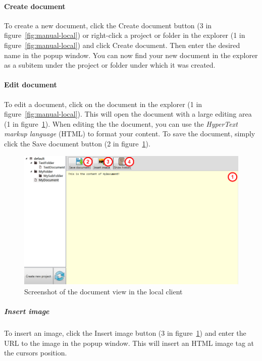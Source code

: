 	\paragraph{Create document}
	To create a new document, click the Create document button (3 in figure~\ref{fig:manual-local}) or right-click a project or folder in the explorer (1 in figure~\ref{fig:manual-local}) and click Create document. Then enter the desired name in the popup window. You can now find your new document in the explorer as a subitem under the project or folder under which it was created.
	
	\paragraph{Edit document}
	To edit a document, click on the document in the explorer (1 in figure~\ref{fig:manual-local}). This will open the document with a large editing area (1 in figure~\ref{fig:manual-local-document}). When editing the the document, you can use the \emph{HyperText markup language}\cite{w3cHTML} (HTML) to format your content. To save the document, simply click the Save document button (2 in figure~\ref{fig:manual-local-document}).
	
	\begin{figure}[htb]
		\centering
		\includegraphics[width=1\textwidth]{User_manual/graphics/local-document.png}
		\caption{Screenshot of the document view in the local client}
		\label{fig:manual-local-document}
	\end{figure}
	
		\subparagraph{Insert image}
		To insert an image, click the Insert image button (3 in figure~\ref{fig:manual-local-document}) and enter the URL to the image in the popup window. This will insert an HTML image tag at the cursors position.
		
